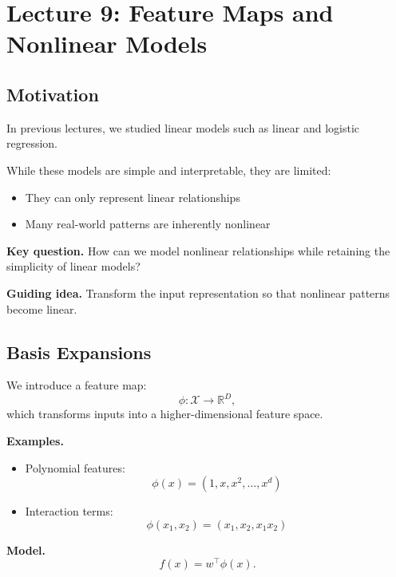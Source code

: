 \section{Lecture 9: Feature Maps and Nonlinear Models}

\subsection{Motivation}

In previous lectures, we studied linear models such as linear and logistic regression.

\medskip

\noindent
While these models are simple and interpretable, they are limited:

\begin{itemize}
    \item They can only represent linear relationships
    \item Many real-world patterns are inherently nonlinear
\end{itemize}

\medskip

\noindent
\textbf{Key question.}  
How can we model nonlinear relationships while retaining the simplicity of linear models?

\medskip

\noindent
\textbf{Guiding idea.}  
Transform the input representation so that nonlinear patterns become linear.

\subsection{Basis Expansions}

We introduce a feature map:
\[
\phi : \mathcal{X} \to \mathbb{R}^D,
\]
which transforms inputs into a higher-dimensional feature space.

\medskip

\noindent
\textbf{Examples.}

\begin{itemize}
    \item Polynomial features:
    \[
    \phi(x) = (1, x, x^2, \dots, x^d)
    \]

    \item Interaction terms:
    \[
    \phi(x_1, x_2) = (x_1, x_2, x_1 x_2)
    \]
\end{itemize}

\medskip

\noindent
\textbf{Model.}
\[
f(x) = w^\top \phi(x).
\]

